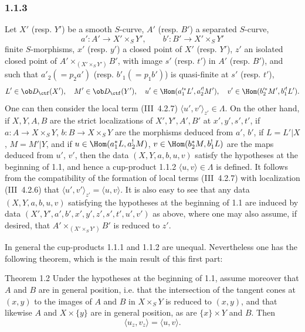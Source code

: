 \subsubsection*{1.1.3}
Let $X'$ (resp. $Y'$) be a smooth $S$-curve, $A'$ (resp. $B'$) a separated $S$-curve,
\[
a':A'\longrightarrow X'\times_S Y',
\qquad
b':B'\longrightarrow X'\times_S Y'
\]
finite $S$-morphisms, $x'$ (resp. $y'$) a closed point of $X'$ (resp. $Y'$), $z'$ an isolated closed point of $A'\times_{(X'\times_S Y')}B'$, with image $s'$ (resp. $t'$) in $A'$ (resp. $B'$), and such that $a'_2(=p_2a')$ (resp. $b'_1(=p_1b')$) is quasi-finite at $s'$ (resp. $t'$),
\[
L'\in\ob D_{\ctf}(X'),\quad M'\in\ob D_{\ctf}(Y'),\quad
u'\in\Hom(a_1'^*L',a_2'^!M'),\quad v'\in\Hom(b_2'^*M',b_1'^!L').
\]
One can then consider the local term (III~4.2.7) $\langle u',v'\rangle_{z'}\in\Lambda$. On the other hand, if $X,Y,A,B$ are the strict localizations of $X',Y',A',B'$ at $x',y',s',t'$, if $a:A\to X\times_S Y$, $b:B\to X\times_SY$ are the morphisms deduced from $a'$, $b'$, if $L=L'|X$, $M=M'|Y$, and if $u\in\Hom(a_1^*L,a_2^!M)$, $v\in\Hom(b_2^*M,b_1^!L)$ are the maps deduced from $u'$, $v'$, then the data $(X,Y,a,b,u,v)$ satisfy the hypotheses at the beginning of 1.1, and hence a cup-product 1.1.2 $\langle u,v\rangle\in\Lambda$ is defined. It follows from the compatibility of the formation of local terms (III~4.2.7) with localization (III~4.2.6) that $\langle u',v'\rangle_{z'}=\langle u,v\rangle$. It is also easy to see that any data $(X,Y,a,b,u,v)$ satisfying the hypotheses at the beginning of 1.1 are induced by data $(X',Y',a',b',x',y',z',s',t',u',v')$ as above, where one may also assume, if desired, that $A'\times_{(X'\times_S Y')}B'$ is reduced to $z'$.

In general the cup-products 1.1.1 and 1.1.2 are unequal. Nevertheless one has the following theorem, which is the main result of this first part:

\begin{statement}{Theorem 1.2}
Under the hypotheses at the beginning of 1.1, assume moreover that $A$ and $B$ are in general position, i.e. that the intersection of the tangent cones at $(x,y)$ to the images of $A$ and $B$ in $X\times_S Y$ is reduced to $(x,y)$, and that likewise $A$ and $X\times\{y\}$ are in general position, as are $\{x\}\times Y$ and $B$. Then
\begin{equation}\tag{1.2.1}
\langle u_z,v_z\rangle=\langle u,v\rangle.
\end{equation}
\end{statement}

